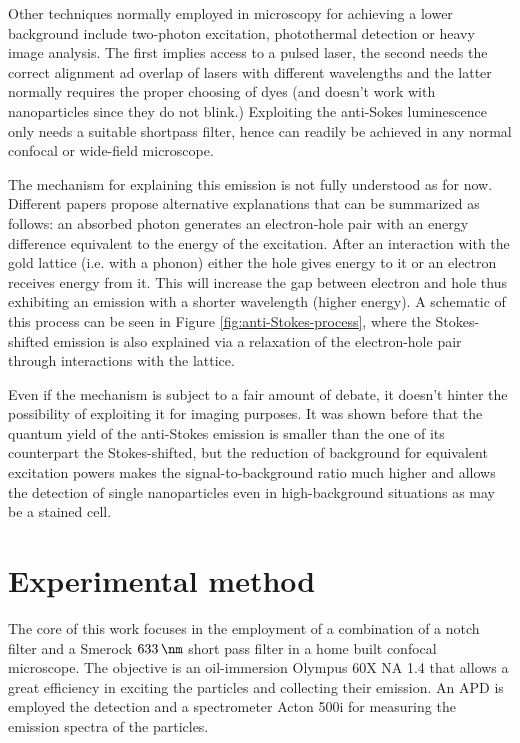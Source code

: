 \documentclass[twocolumn]{article}
\begin{document}
Other techniques normally employed in microscopy for achieving a lower
background include two-photon excitation, photothermal detection or heavy image analysis.
The first implies access to a pulsed laser, the second needs the
correct alignment ad overlap of lasers with different wavelengths and the latter
normally requires the proper choosing of dyes (and doesn't work with
nanoparticles since they do not blink.) Exploiting the anti-Sokes luminescence
only needs a suitable shortpass filter, hence can readily be achieved in any
normal confocal or wide-field microscope. 

The mechanism for explaining this emission is not fully understood as for now.
Different papers propose alternative explanations that can be summarized as
follows: an absorbed photon generates an electron-hole pair with an energy
difference equivalent to the energy of the excitation. After an interaction with
the gold lattice (i.e. with a phonon) either the hole gives energy to it or an
electron receives energy from it. This will increase the gap between electron
and hole thus exhibiting an emission with a shorter wavelength (higher energy).
A schematic of this process can be seen in Figure \ref{fig:anti-Stokes-process},
where the Stokes-shifted emission is also explained via a relaxation of the
electron-hole pair through interactions with the lattice. 

Even if the mechanism is subject to a fair amount of debate, it doesn't hinter
the possibility of exploiting it for imaging purposes. It was shown before that
the quantum yield of the anti-Stokes emission is smaller than the one of its
counterpart the Stokes-shifted, but the reduction of background for equivalent
excitation powers makes the signal-to-background ratio much higher and allows
the detection of single nanoparticles even in high-background situations as may
be a stained cell. 

\section{Experimental method}
The core of this work focuses in the employment of a combination of a notch
filter and a  Smerock $633\,\nm$ short pass filter in a home built confocal
microscope. The objective is an oil-immersion Olympus 60X NA 1.4 that allows a
great efficiency in exciting the particles and collecting their emission. An APD
is employed the detection and a spectrometer Acton 500i for measuring the
emission spectra of the particles.
\end{document}

